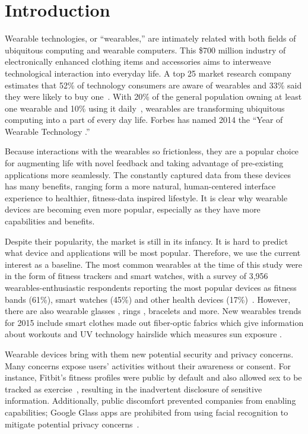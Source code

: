 \section{Introduction}

Wearable technologies, or ``wearables,'' are intimately related with both fields of ubiquitous computing and wearable computers. This \$700 million industry \cite{cmo} of electronically enhanced clothing items and accessories aims to interweave technological interaction into everyday life. A top 25 market research company estimates that 52\% of technology consumers are aware of wearables and 33\% said they were likely to buy one~\cite{NPD}. With 20\% of the general population owning at least one wearable and 10\% using it daily~\cite{WearableStatNews}, wearables are transforming ubiquitous computing into a part of every day life. Forbes has named 2014 the ``Year of Wearable Technology \cite{Forbes}.''

Because interactions with the wearables so frictionless, they are a popular choice for augmenting life with novel feedback and taking advantage of pre-existing applications more seamlessly. The constantly captured data from these devices has many benefits, ranging form a more natural, human-centered interface experience to healthier, fitness-data inspired lifestyle. It is clear why wearable devices are becoming even more popular, especially as they have more capabilities and benefits. 

Despite their popularity, the market is still in its infancy. It is hard to predict what device and applications will be most popular. Therefore, we use the current interest as a baseline. The most common wearables at the time of this study were in the form of fitness trackers and smart watches, with a survey of 3,956 wearables-enthusiastic respondents reporting the most popular devices as fitness bands (61\%), smart watches (45\%) and other health devices (17\%)~\cite{Nilsen}.  However, there are also wearable glasses \cite{ 2_google_2014, 3_sony_global_2014}, rings \cite{4_ringly_2014}, bracelets \cite{5_intel_2014} and more. New wearables trends for 2015 include smart clothes made out fiber-optic fabrics which give information about workouts and UV technology hairslide which measures sun exposure \cite{1_digital_trends_2014, 2_arthur_2014}.


Wearable devices bring with them new potential security and privacy concerns. Many concerns expose users' activities without their awareness or consent. For instance, Fitbit's fitness profiles were public by default and also allowed sex to be tracked as exercise~\cite{Fitbit}, resulting in the inadvertent disclosure of sensitive information. Additionally, public discomfort prevented companies from enabling capabilities; Google Glass apps are prohibited from using facial recognition to mitigate potential privacy concerns~\cite{GlassDetection}.

